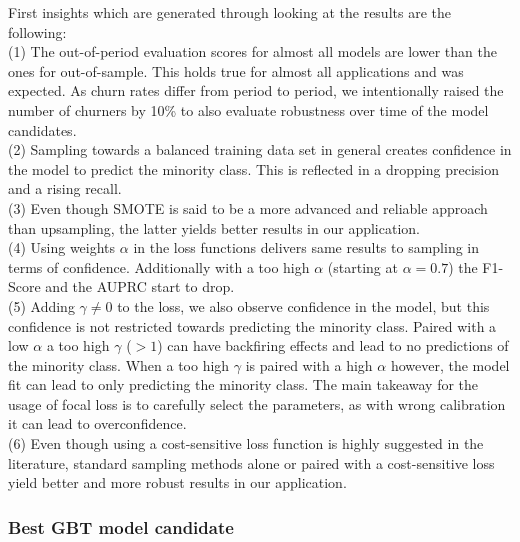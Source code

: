 \documentclass[12pt,titlepage]{article}
\begin{document}
First insights which are generated through looking at the results are the following: \\
(1) The out-of-period evaluation scores for almost all models are lower than the ones for out-of-sample. This holds true for almost all applications and was expected. As churn rates differ from period to period, we intentionally raised the number of churners by 10\% to also evaluate robustness over time of the model candidates. \\
(2) Sampling towards a balanced training data set in general creates confidence in the model to predict the minority class. This is reflected in a dropping precision and a rising recall. \\
(3) Even though SMOTE is said to be a more advanced and reliable approach than upsampling, the latter yields better results in our application.\\
(4) Using weights $\alpha$ in the loss functions delivers same results to sampling in terms of confidence. Additionally with a too high $\alpha$ (starting at $\alpha=0.7$) the F1-Score and the AUPRC start to drop.\\
(5) Adding $\gamma\neq0$ to the loss, we also observe confidence in the model, but this confidence is not restricted towards predicting the minority class. Paired with a low $\alpha$ a too high $\gamma$ ($>1$) can have backfiring effects and lead to no predictions of the minority class. When a too high $\gamma$ is paired with a high $\alpha$ however, the model fit can lead to only predicting the minority class. The main takeaway for the usage of focal loss is to carefully select the parameters, as with wrong calibration it can lead to overconfidence. \\
(6) Even though using a cost-sensitive loss function is highly suggested in the literature, standard sampling methods alone or paired with a cost-sensitive loss yield better and more robust results in our application. \\

\subsubsection*{Best GBT model candidate}
\end{document}
